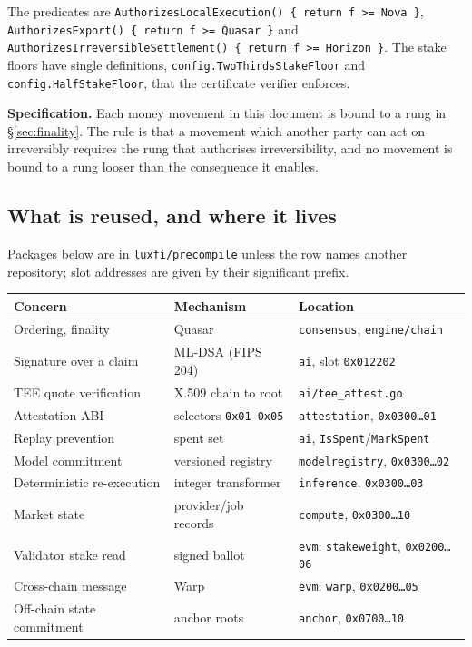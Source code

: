 \documentclass[11pt,a4paper]{article}
\theoremstyle{definition}
\theoremstyle{remark}
\newcommand{\code}[1]{\texttt{#1}}
\begin{document}
The predicates are \code{AuthorizesLocalExecution() \{ return f >= Nova \}},
\code{AuthorizesExport() \{ return f >= Quasar \}} and
\code{AuthorizesIrreversibleSettlement() \{ return f >= Horizon \}}. The stake
floors have single definitions, \code{config.TwoThirdsStakeFloor} and
\code{config.HalfStakeFloor}, that the certificate verifier enforces.

\textbf{Specification.} Each money movement in this document is bound to a rung
in \S\ref{sec:finality}. The rule is that a movement which another party can act
on irreversibly requires the rung that authorises irreversibility, and no
movement is bound to a rung looser than the consequence it enables.

\subsection{What is reused, and where it lives}

Packages below are in \code{luxfi/precompile} unless the row names another
repository; slot addresses are given by their significant prefix.

\begin{center}
\small
\begin{tabular}{@{}lll@{}}
\toprule
Concern & Mechanism & Location \\
\midrule
Ordering, finality & Quasar & \code{consensus}, \code{engine/chain} \\
Signature over a claim & ML-DSA (FIPS 204) & \code{ai}, slot \code{0x012202} \\
TEE quote verification & X.509 chain to root & \code{ai/tee\_attest.go} \\
Attestation ABI & selectors \code{0x01}--\code{0x05} & \code{attestation}, \code{0x0300\ldots01} \\
Replay prevention & spent set & \code{ai}, \code{IsSpent}/\code{MarkSpent} \\
Model commitment & versioned registry & \code{modelregistry}, \code{0x0300\ldots02} \\
Deterministic re-execution & integer transformer & \code{inference}, \code{0x0300\ldots03} \\
Market state & provider/job records & \code{compute}, \code{0x0300\ldots10} \\
Validator stake read & signed ballot & \code{evm}: \code{stakeweight}, \code{0x0200\ldots06} \\
Cross-chain message & Warp & \code{evm}: \code{warp}, \code{0x0200\ldots05} \\
Off-chain state commitment & anchor roots & \code{anchor}, \code{0x0700\ldots10} \\
\bottomrule
\end{tabular}
\end{center}
\end{document}

